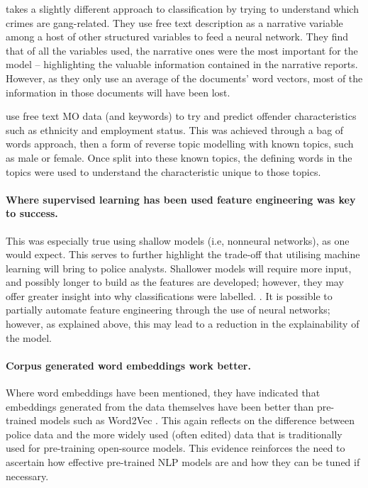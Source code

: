 \textcite{seo2018partially} takes a slightly different approach to classification by trying to understand which crimes are gang-related. They use free text description as a narrative variable among a host of other structured variables to feed a neural network. They find that of all the variables used, the narrative ones were the most important for the model – highlighting the valuable information contained in the narrative reports. However, as they only use an average of the documents’ word vectors, most of the information in those documents will have been lost.

\textcite{bache2010language}  use free text MO data (and keywords) to try and predict offender characteristics such as ethnicity and employment status. This was achieved through a bag of words approach, then a form of reverse topic modelling with known topics, such as male or female. Once split into these known topics, the defining words in the topics were used to understand the characteristic unique to those topics.

\paragraph{Where supervised learning has been used feature engineering was key to success.} This was especially true using shallow models (i.e, nonneural networks), as one would expect. This serves to further highlight the trade-off that utilising machine learning will bring to police analysts. Shallower models will require more input, and possibly longer to build as the features are developed; however, they may offer greater insight into why classifications were labelled. \parencite{vandePutte2009425, Bachenko200841,Ku201318}. It is possible to partially automate feature engineering through the use of neural networks; however, as explained above, this may lead to a reduction in the explainability of the model.

\paragraph{Corpus generated word embeddings work better.} Where word embeddings have been mentioned, they have indicated that embeddings generated from the data themselves have been better than pre-trained models such as Word2Vec  \parencite{Schraagen201979,Haleem20192279}. This again reflects on the difference between police data and the more widely used (often edited) data that is traditionally used for pre-training open-source models. This evidence reinforces the need to ascertain how effective pre-trained NLP models are and how they can be tuned if necessary.

